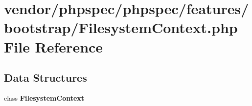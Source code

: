 \section{vendor/phpspec/phpspec/features/bootstrap/\+Filesystem\+Context.php File Reference}
\label{_filesystem_context_8php}
\subsection*{Data Structures}
\begin{DoxyCompactItemize}
\item 
class {\bf Filesystem\+Context}
\end{DoxyCompactItemize}
